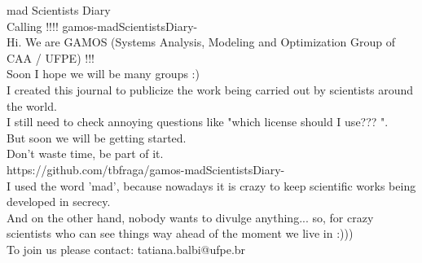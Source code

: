 \documentclass{book}
\begin{document}
\huge{mad Scientists Diary} \\

\large{Calling !!!! gamos-madScientistsDiary-} \\

Hi. We are GAMOS (Systems Analysis, Modeling and Optimization Group of CAA / UFPE) !!! \\

Soon I hope we will be many groups :) \\

I created this journal to publicize the work being carried out by scientists around the world. \\

I still need to check annoying questions like "which license should I use??? ". \\

But soon we will be getting started. \\

Don't waste time, be part of it. \\

https://github.com/tbfraga/gamos-madScientistsDiary- \\

I used the word 'mad', because nowadays it is crazy to keep scientific works being developed in secrecy. \\

And on the other hand, nobody wants to divulge anything... so, for crazy scientists who can see things way ahead of the moment we live in :))) \\

To join us please contact: tatiana.balbi@ufpe.br
\end{document}
